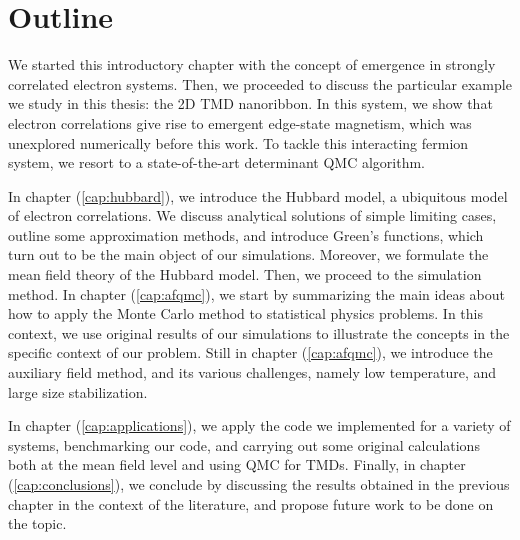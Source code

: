 \section{Outline}
\label{sec:int_outline}

We started this introductory chapter with the concept of emergence in strongly correlated electron systems.
Then, we proceeded to discuss the particular example we study in this thesis: the \acs{2D} \acs{TMD} nanoribbon.
In this system, we show that electron correlations give rise to emergent edge-state magnetism, which was unexplored numerically  before this work.
To tackle this interacting fermion system, we resort to a state-of-the-art determinant  \ac{QMC} algorithm.

In chapter (\ref{cap:hubbard}), we introduce the Hubbard model, a ubiquitous model of electron correlations.
We discuss analytical solutions of simple limiting cases, outline some approximation methods, and introduce Green's functions, which turn out to be the main object of our simulations.
Moreover, we formulate the mean field theory of the Hubbard model.
Then, we proceed to the simulation method.
In chapter (\ref{cap:afqmc}), we start by summarizing the main ideas about how to apply the Monte Carlo method to statistical physics problems.
In this context, we use original results of our simulations to illustrate the concepts in the specific context of our problem.
Still in chapter (\ref{cap:afqmc}), we introduce the auxiliary field method, and its various challenges, namely low temperature, and large size stabilization.

In chapter (\ref{cap:applications}), we apply the code we implemented for a variety of systems, benchmarking our code, and carrying out some original calculations both at the mean field level and using \acs{QMC} for \acp{TMD}.
Finally, in chapter (\ref{cap:conclusions}), we conclude by discussing the results obtained in the previous chapter in the context of the literature, and propose future work to be done on the topic.